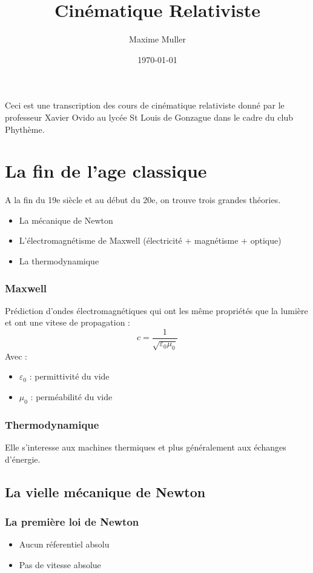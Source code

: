 \documentclass{article}
\title{Cinématique Relativiste}
\author{Maxime Muller}
\date{\today}
\begin{document}
\maketitle

Ceci est une transcription des cours de cinématique relativiste donné par le professeur Xavier Ovido au lycée St Louis de Gonzague dans le cadre du club Phythème.

\section{La fin de l'age classique}
A la fin du 19e siècle et au début du 20e, on trouve trois grandes théories.
\begin{itemize}
    \item La mécanique de Newton
    \item L'électromagnétisme de Maxwell (électricité + magnétisme + optique)
    \item La thermodynamique
\end{itemize}
\subsubsection{Maxwell}
Prédiction d'ondes électromagnétiques qui ont les même propriétés que la lumière et ont une vitese de propagation :
\begin{equation*}
    c = \frac{1}{\sqrt{\varepsilon_0 \mu_0}}
\end{equation*}
Avec :
\begin{itemize}
    \item $\varepsilon_0$ : permittivité du vide
    \item $\mu_0$ : perméabilité du vide
\end{itemize}
\subsubsection{Thermodynamique}
Elle s'interesse aux machines thermiques et plus généralement aux échanges d'énergie.
\newpage
\subsection{La vielle mécanique de Newton}
\subsubsection{La première loi de Newton}
\begin{itemize}
    \item Aucun réferentiel absolu
    \item Pas de vitesse absolue
\end{itemize}
\end{document}
